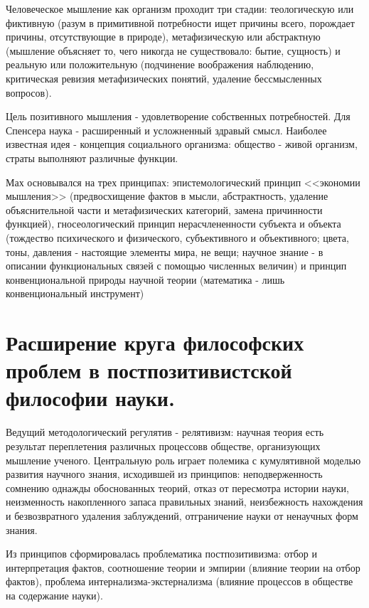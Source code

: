 \documentclass[12pt, specialist, subf, substylefile = spbu.rtx]{disser}
\begin{document}
Человеческое мышление как организм проходит три стадии: теологическую или фиктивную (разум в примитивной потребности ищет причины всего, порождает причины, отсутствующие в природе), метафизическую или абстрактную (мышление объясняет то, чего никогда не существовало: бытие, сущность) и реальную или положительную (подчинение воображения наблюдению, критическая ревизия метафизических понятий, удаление бессмысленных вопросов).

Цель позитивного мышления - удовлетворение собственных потребностей.
Для Спенсера наука - расширенный и усложненный здравый смысл. Наиболее известная идея - концепция социального организма: общество - живой организм, страты выполняют различные функции.

Мах основывался на трех принципах: эпистемологический принцип <<экономии мышления>> (предвосхищение фактов в мысли, абстрактность, удаление объяснительной части и метафизических категорий, замена причинности функцией), гносеологический принцип нерасчлененности субъекта и объекта (тождество психического и физического, субъективного и объективного; цвета, тоны, давления - настоящие элементы мира, не вещи; научное знание - в описании функциональных связей с помощью численных величин) и принцип конвенциональной природы научной теории (математика - лишь конвенциональный инструмент)

\section{Расширение круга философских проблем в постпозитивистской философии науки.}
Ведущий методологический регулятив - релятивизм: научная теория есть результат переплетения различных процессовв обществе, организующих мышление ученого. Центральную роль играет полемика с кумулятивной моделью развития научного знания, исходившей из принципов: неподверженность сомнению однажды обоснованных теорий, отказ от пересмотра истории науки, неизменность накопленного запаса правильных знаний, неизбежность нахождения и безвозвратного удаления заблуждений, отграничение науки от ненаучных форм знания.

Из принципов сформировалась проблематика постпозитивизма: отбор и интерпретация фактов, соотношение теории и эмпирии (влияние теории на отбор фактов), проблема интернализма-экстернализма (влияние процессов в обществе на содержание науки).
\end{document}
